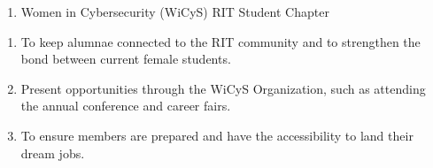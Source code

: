 


\begin{enumerate}
	\item Women in Cybersecurity (WiCyS) RIT Student Chapter
\end{enumerate}


\begin{enumerate}
	\item To keep alumnae connected to the RIT community and to strengthen the bond between current female students.
      \item Present opportunities through the WiCyS Organization, such as attending the annual conference and career fairs. 
      \item To ensure members are prepared and have the accessibility to land their dream jobs. 
\end{enumerate}



